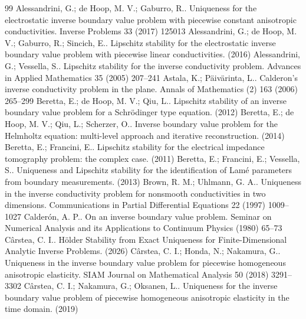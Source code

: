 \documentclass[10pt,a4paper]{amsart}
\begin{document}
\begin{thebibliography}{99}
 Alessandrini, G.; de Hoop, M. V.; Gaburro, R.. Uniqueness for the electrostatic inverse boundary value problem with piecewise constant anisotropic conductivities. Inverse Problems 33 (2017) 125013
 Alessandrini, G.; de Hoop, M. V.; Gaburro, R.; Sincich, E.. Lipschitz stability for the electrostatic inverse boundary value problem with piecewise linear conductivities. (2016)
 Alessandrini, G.; Vessella, S.. Lipschitz stability for the inverse conductivity problem. Advances in Applied Mathematics 35 (2005) 207--241
 Astala, K.; P{\"a}iv{\"a}rinta, L.. Calderon's inverse conductivity problem in the plane. Annals of Mathematics (2) 163 (2006) 265--299
 Beretta, E.; de Hoop, M. V.; Qiu, L.. Lipschitz stability of an inverse boundary value problem for a {Schr{\"o}dinger} type equation. (2012)
 Beretta, E.; de Hoop, M. V.; Qiu, L.; Scherzer, O.. Inverse boundary value problem for the {Helmholtz} equation: multi-level approach and iterative reconstruction. (2014)
 Beretta, E.; Francini, E.. Lipschitz stability for the electrical impedance tomography problem: the complex case. (2011)
 Beretta, E.; Francini, E.; Vessella, S.. Uniqueness and {Lipschitz} stability for the identification of {Lam{\'e}} parameters from boundary measurements. (2013)
 Brown, R. M.; Uhlmann, G. A.. Uniqueness in the inverse conductivity problem for nonsmooth conductivities in two dimensions. Communications in Partial Differential Equations 22 (1997) 1009--1027
 Calder{\'o}n, A. P.. On an inverse boundary value problem. Seminar on Numerical Analysis and its Applications to Continuum Physics (1980) 65--73
 C{\^a}rstea, C. I.. H{\"o}lder Stability from Exact Uniqueness for Finite-Dimensional Analytic Inverse Problems. (2026)
 C{\^a}rstea, C. I.; Honda, N.; Nakamura, G.. Uniqueness in the inverse boundary value problem for piecewise homogeneous anisotropic elasticity. SIAM Journal on Mathematical Analysis 50 (2018) 3291--3302
 C{\^a}rstea, C. I.; Nakamura, G.; Oksanen, L.. Uniqueness for the inverse boundary value problem of piecewise homogeneous anisotropic elasticity in the time domain. (2019)

\end{thebibliography}
\end{document}
